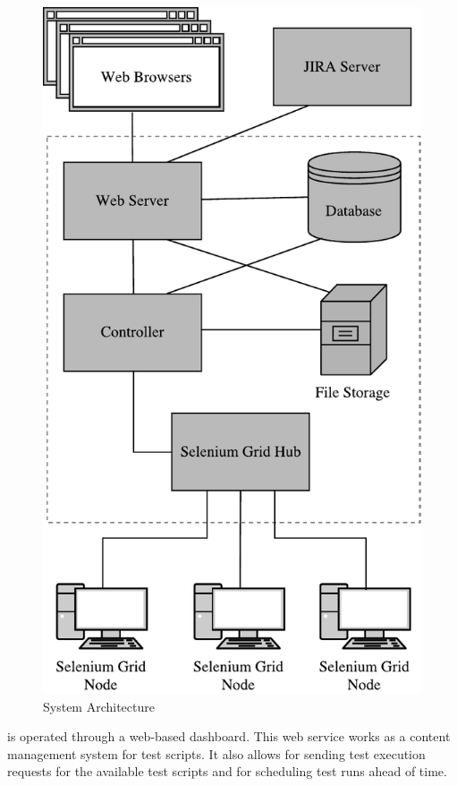 \begin{figure}[p]
    \centering
    \includegraphics[height=\textheight]{figures/architecture4.pdf}
    \caption{System Architecture}
    \label{fig.architecture}
\end{figure}

\toolname \space is operated through a web-based dashboard. This web service works as a content management system for test scripts. It also allows for sending test execution requests for the available test scripts and for scheduling test runs ahead of time. 

